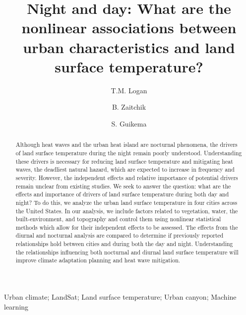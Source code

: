 \documentclass[final,3p,times,twocolumn,sort&compress]{elsarticle}
\begin{document}
\begin{frontmatter}

\title{Night and day: What are the nonlinear associations between urban characteristics and land surface temperature?}

\author[1]{T.M. Logan}

\author[2]{B. Zaitchik}
\author[1]{S. Guikema}


\address[1]{Industrial and Operations Engineering, University of Michigan, Ann Arbor, MI}
\address[2]{Earth and Planetary Sciences, Johns Hopkins University, Baltimore, MD}

\begin{abstract}
Although heat waves and the urban heat island are nocturnal phenomena, the drivers of land surface temperature during the night remain poorly understood.
Understanding these drivers is necessary for reducing land surface temperature and mitigating heat waves, the deadliest natural hazard, which are expected to increase in frequency and severity.
However, the independent effects and relative importance of potential drivers remain unclear from existing studies.
We seek to answer the question: what are the effects and importance of drivers of land surface temperature during both day and night?
To do this, we analyze the urban land surface temperature in four cities across the United States.
In our analysis, we include factors related to vegetation, water, the built-environment, and topography and control them using nonlinear statistical methods which allow for their independent effects to be assessed.
The effects from the diurnal and nocturnal analysis are compared to determine if previously reported relationships hold between cities and during both the day and night.
Understanding the relationships influencing both nocturnal and diurnal land surface temperature will improve climate adaptation planning and heat wave mitigation.
\end{abstract}

\begin{keyword}
Urban climate; LandSat; Land surface temperature; Urban canyon; Machine learning
\end{keyword}

\end{frontmatter}
\end{document}
